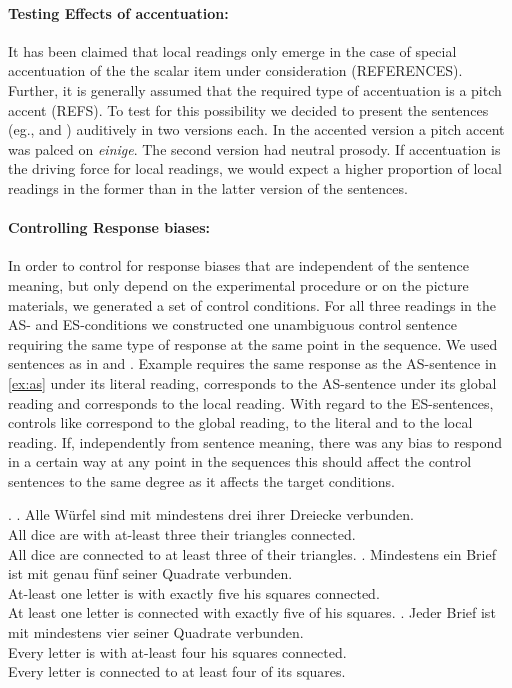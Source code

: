 \documentclass[a4paper,10pt]{article}
\begin{document}
\paragraph{Testing Effects of accentuation:} It has been claimed that local readings only emerge in the case of special accentuation of the the scalar item under consideration (REFERENCES). Further, it is generally assumed that the required type of accentuation is a pitch accent (REFS). To test for this possibility we decided to present the sentences  (eg., \LLast and \Last) auditively in two versions each. In the accented version a pitch accent was palced on {\it einige}. The second version had neutral prosody. If accentuation is the driving force for local readings, we would expect a higher proportion of local readings in the former than in the latter version of the sentences.

\paragraph{Controlling Response biases:} In order to control for response biases that are independent of the sentence meaning, but only depend on the experimental procedure or on the picture materials, we generated a set of control conditions. For all three readings in the AS- and ES-conditions we constructed one unambiguous control sentence requiring the same type of response at the same point in the sequence. We used sentences as in \Next and \NNext. Example \Next[a] requires the same response as the AS-sentence in \ref{ex:as} under its literal reading, \Next[b] corresponds to the AS-sentence under its global reading and \Next[c] corresponds to the local reading. With regard to the ES-sentences, controls like \NNext[a] correspond to the global reading, \NNext[b] to the literal and \NNext[c] to the local reading.  If, independently from sentence meaning, there was any bias to respond in a certain way at any point in the sequences this should affect the control sentences to the same degree as it affects the target conditions.

\ex. \ag. Alle W\"urfel sind mit mindestens drei ihrer Dreiecke verbunden.\\
All dice are with at-least three their triangles connected.\\
All dice are connected to at least three of their triangles. 
\bg. Mindestens ein Brief ist mit genau f\"unf seiner Quadrate verbunden.\\
At-least one letter is with exactly five his squares connected.\\
At least one letter is connected with exactly five of his squares. 
\bg. Jeder Brief ist mit mindestens vier seiner Quadrate verbunden.\\
Every letter is with at-least four his squares connected.\\
Every letter is connected to at least four of its squares.
\end{document}
